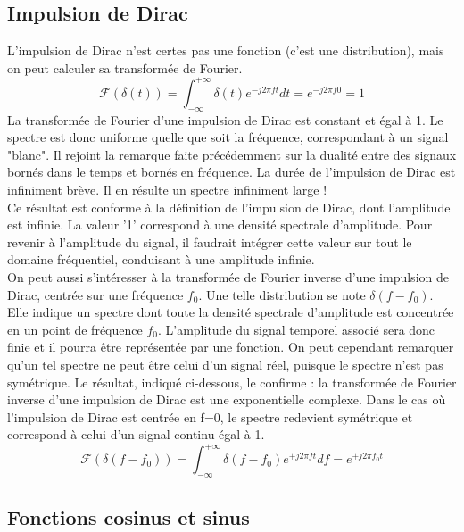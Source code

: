 	
	
	\subsection{Impulsion de Dirac}
	L'impulsion de Dirac n'est certes pas une fonction (c'est une distribution), mais on peut calculer sa transformée de Fourier. 
	\begin{equation}\label{key}
	\mathcal{F}(\delta(t))=\int_{-\infty}^{+\infty}\delta(t) e^{-j2\pi ft}dt = e^{-j2\pi f0}=1
	\end{equation}
	La transformée de Fourier d'une impulsion de Dirac est constant et égal à 1. Le spectre est donc uniforme quelle que soit la fréquence, correspondant à un signal "blanc". Il rejoint la remarque faite précédemment sur la dualité entre des signaux bornés dans le temps et bornés en fréquence. La durée de l'impulsion de Dirac est infiniment brève. Il en résulte un spectre infiniment large !\\
	Ce résultat est conforme à la définition de l'impulsion de Dirac, dont l'amplitude est infinie. La valeur '1' correspond à une densité spectrale d'amplitude. Pour revenir à l'amplitude du signal, il faudrait intégrer cette valeur sur tout le domaine fréquentiel, conduisant à une amplitude infinie.\\
	
	On peut aussi s'intéresser à la transformée de Fourier inverse d'une impulsion de Dirac, centrée sur une fréquence $f_0$. Une telle distribution se note $\delta(f-f_0)$. Elle indique un spectre dont toute la densité spectrale d'amplitude est concentrée en un point de fréquence $f_0$. L'amplitude du signal temporel associé sera donc finie et il pourra être représentée par une fonction. On peut cependant remarquer qu'un tel spectre ne peut être celui d'un signal réel, puisque le spectre n'est pas symétrique. Le résultat, indiqué ci-dessous, le confirme : la transformée de Fourier inverse d'une impulsion de Dirac est une exponentielle complexe. Dans le cas où l'impulsion de Dirac est centrée en f=0, le spectre redevient symétrique et correspond à celui d'un signal continu égal à 1.
	\begin{equation}\label{key}
	\mathcal{F}(\delta(f-f_0))=\int_{-\infty}^{+\infty}\delta(f-f_0) e^{+j2\pi ft}df=e^{+j2\pi f_0 t}
	\end{equation}
	
	
	
	
	\subsection{Fonctions cosinus et sinus}
	
